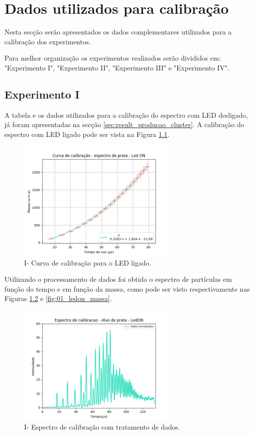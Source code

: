 \appendix
\chapter{Dados utilizados para calibração}
\label{sec:apendice}
Nesta secção serão apresentados os dados complementares utilizados para a calibração dos experimentos.

Para melhor organização os experimentos realizados serão divididos em: "Experimento I", "Experimento II", "Experimento III" e "Experimento IV".

\section{Experimento I}
A tabela e os dados utilizados para a calibração do espectro com LED desligado, já foram apresentadas na secção \ref{sec:result_producao_cluster}. A calibração do espectro com LED ligado pode ser vista na Figura \ref{fig:01_calib_ledON}.

\begin{figure}
  \centering  
  \includegraphics[width=0.7\textwidth]{exp_01/LEDON_curv+erro_calib.png}
  \caption{I- Curva de calibração para o LED ligado.}
  \label{fig:01_calib_ledON} 
\end{figure}

Utilizando o processamento de dados foi obtido o espectro de partículas em função do tempo e em função da massa, como pode ser visto respectivamente nas Figuras \ref{fig:01_ledon_dados_tratados} e \ref{fig:01_ledon_massa}.

\begin{figure}
  \centering  
  \includegraphics[width=0.7\textwidth]{exp_01/LedON_normalizado_mcp.png}
  \caption{I- Espectro de calibração com tratamento de dados.}
  \label{fig:01_ledon_dados_tratados} 
\end{figure}

